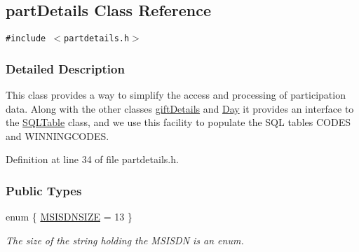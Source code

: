 \hypertarget{classpartDetails}{
\subsection{part\-Details Class Reference}
\label{classpartDetails}
}
{\tt \#include $<$partdetails.h$>$}



\subsubsection{Detailed Description}
This class provides a way to simplify the access and processing of participation data. Along with the other classes \hyperlink{classgiftDetails}{gift\-Details} and \hyperlink{classDay}{Day} it provides an interface to the \hyperlink{classSQLTable}{SQLTable} class, and we use this facility to populate the SQL tables CODES and WINNINGCODES. 



Definition at line 34 of file partdetails.h.\subsubsection*{Public Types}
\begin{CompactItemize}
\item 
enum \{ \hyperlink{classpartDetails_partDetailss1partDetailss0}{MSISDNSIZE} =  13
 \}
\begin{CompactList}\small\item\em The size of the string holding the MSISDN is an enum.\item\end{CompactList}\end{CompactItemize}
